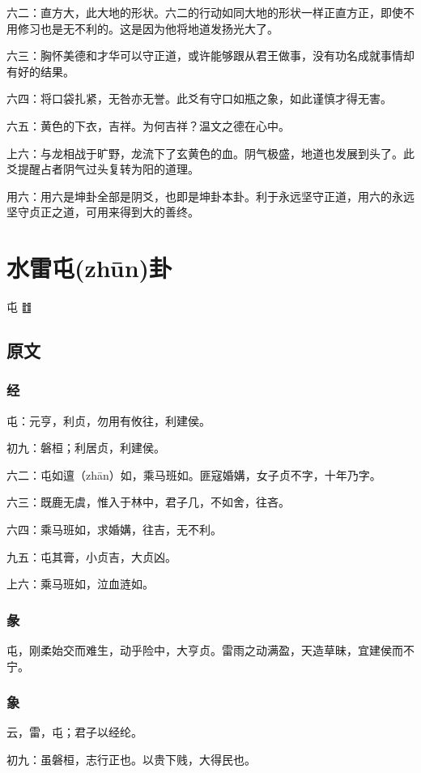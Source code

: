 \documentclass[12pt,oneside]{book}
\begin{document}
六二：直方大，此大地的形状。六二的行动如同大地的形状一样正直方正，即使不用修习也是无不利的。这是因为他将地道发扬光大了。

六三：胸怀美德和才华可以守正道，或许能够跟从君王做事，没有功名成就事情却有好的结果。

六四：将口袋扎紧，无咎亦无誉。此爻有守口如瓶之象，如此谨慎才得无害。

六五：黄色的下衣，吉祥。为何吉祥？温文之德在心中。

上六：与龙相战于旷野，龙流下了玄黄色的血。阴气极盛，地道也发展到头了。此爻提醒占者阴气过头复转为阳的道理。

用六：用六是坤卦全部是阴爻，也即是坤卦本卦。利于永远坚守正道，用六的永远坚守贞正之道，可用来得到大的善终。





\chapter{水雷屯(zhūn)卦}
屯 {\Large ䷂}

\section{原文}
\subsection{经}
屯：元亨，利贞，勿用有攸往，利建侯。

初九：磐桓；利居贞，利建侯。

六二：屯如邅（zhān）如，乘马班如。匪寇婚媾，女子贞不字，十年乃字。

六三：既鹿无虞，惟入于林中，君子几，不如舍，往吝。

六四：乘马班如，求婚媾，往吉，无不利。

九五：屯其膏，小贞吉，大贞凶。

上六：乘马班如，泣血涟如。

\subsection{彖}
屯，刚柔始交而难生，动乎险中，大亨贞。雷雨之动满盈，天造草昧，宜建侯而不宁。

\subsection{象}
云，雷，屯；君子以经纶。

初九：虽磐桓，志行正也。以贵下贱，大得民也。
\end{document}

